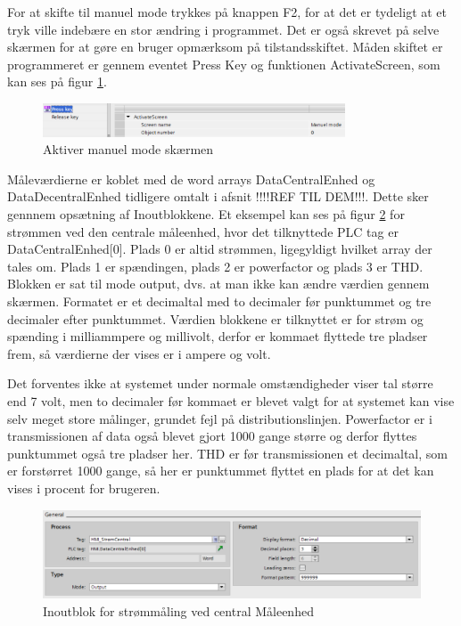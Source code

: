 For at skifte til manuel mode trykkes på knappen F2, for at det er tydeligt at et tryk ville indebære en stor ændring i programmet. Det er også skrevet på selve skærmen for at gøre en bruger opmærksom på tilstandsskiftet. Måden skiftet er programmeret er gennem eventet Press Key og funktionen ActivateScreen, som kan ses på figur \ref{fig:ActivateScreen}.

\begin{figure}[H] %
	\centering
	\includegraphics[width=0.8\textwidth]{Figure/ActivateScreen}
	\caption{Aktiver manuel mode skærmen}
	\label{fig:ActivateScreen}
\end{figure}

Måleværdierne er koblet med de word arrays DataCentralEnhed og DataDecentralEnhed tidligere omtalt i afsnit !!!!REF TIL DEM!!!. Dette sker gennnem opsætning af Inoutblokkene. Et eksempel kan ses på figur \ref{fig:OutputblokMaelingStroemCentral} for strømmen ved den centrale måleenhed, hvor det tilknyttede PLC tag er DataCentralEnhed[0]. Plads 0 er altid strømmen, ligegyldigt hvilket array der tales om. Plads 1 er spændingen, plads 2 er powerfactor og plads 3 er THD. Blokken er sat til mode output, dvs. at man ikke kan ændre værdien gennem skærmen. Formatet er et decimaltal med to decimaler før punktummet og tre decimaler efter punktummet.
Værdien blokkene er tilknyttet er for strøm og spænding i milliammpere og millivolt, derfor er kommaet flyttede tre pladser frem, så værdierne der vises er i ampere og volt.


Det forventes ikke at systemet under normale omstændigheder viser tal større end 7 volt, men to decimaler før kommaet er blevet valgt for at systemet kan vise selv meget store målinger, grundet fejl på distributionslinjen. Powerfactor er i transmissionen af data også blevet gjort 1000 gange større og derfor flyttes punktummet også tre pladser her. THD er før transmissionen et decimaltal, som er forstørret 1000 gange, så her er punktummet flyttet en plads for at det kan vises i procent for brugeren.

\begin{figure}[H] %
	\centering
	\includegraphics[width=1\textwidth]{Figure/OutputblokMaelingStroemCentral}
	\caption{Inoutblok for strømmåling ved central Måleenhed}
	\label{fig:OutputblokMaelingStroemCentral}
\end{figure}

